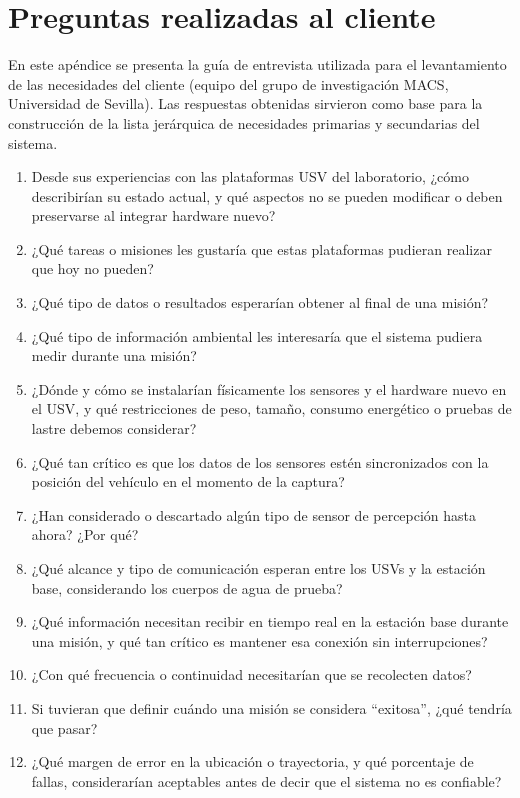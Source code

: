 \chapter{Preguntas realizadas al cliente}
\label{ap:entrevista}
 
En este apéndice se presenta la guía de entrevista utilizada para el levantamiento de las 
necesidades del cliente (equipo del grupo de investigación MACS, Universidad de Sevilla). 
Las respuestas obtenidas sirvieron como base para la construcción de la lista jerárquica de 
necesidades primarias y secundarias del sistema.



\begin{enumerate}
    \item Desde sus experiencias con las plataformas USV del laboratorio, ¿cómo describirían su estado actual, y qué aspectos no se pueden modificar o deben preservarse al integrar hardware nuevo?
    \item ¿Qué tareas o misiones les gustaría que estas plataformas pudieran realizar que hoy no pueden?
    \item ¿Qué tipo de datos o resultados esperarían obtener al final de una misión?
    \item ¿Qué tipo de información ambiental les interesaría que el sistema pudiera medir durante una misión?
    \item ¿Dónde y cómo se instalarían físicamente los sensores y el hardware nuevo en el USV, y qué restricciones de peso, tamaño, consumo energético o pruebas de lastre debemos considerar?
    \item ¿Qué tan crítico es que los datos de los sensores estén sincronizados con la posición del vehículo en el momento de la captura?
    \item ¿Han considerado o descartado algún tipo de sensor de percepción hasta ahora? ¿Por qué?
    \item ¿Qué alcance y tipo de comunicación esperan entre los USVs y la estación base, considerando los cuerpos de agua de prueba?
    \item ¿Qué información necesitan recibir en tiempo real en la estación base durante una misión, y qué tan crítico es mantener esa conexión sin interrupciones?
    \item ¿Con qué frecuencia o continuidad necesitarían que se recolecten datos?
    \item Si tuvieran que definir cuándo una misión se considera “exitosa”, ¿qué tendría que pasar?
    \item ¿Qué margen de error en la ubicación o trayectoria, y qué porcentaje de fallas, considerarían aceptables antes de decir que el sistema no es confiable?

\end{enumerate}

